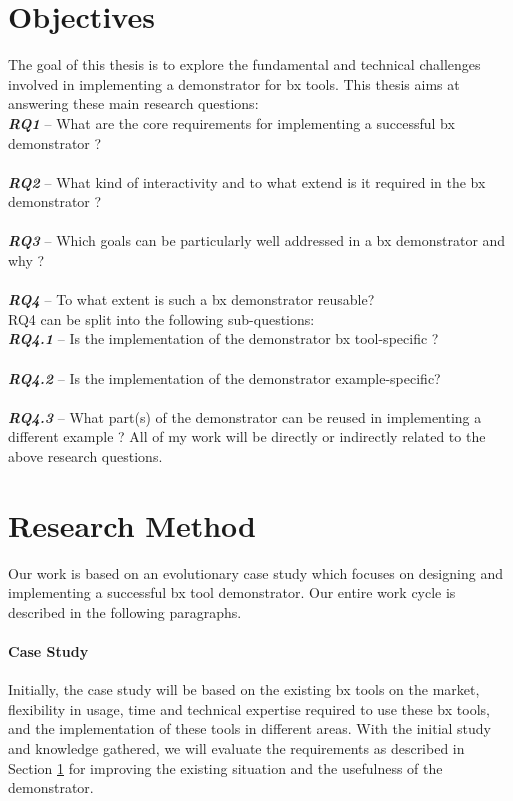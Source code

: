 \section{Objectives}\label{sec:objectives}
The goal of this thesis is to explore the fundamental and technical challenges involved in implementing a demonstrator for bx tools.
\newline\newline This thesis aims at answering these main research questions:
\\\textbf{\textit{RQ1}} -- What are the core requirements for implementing a successful bx demonstrator ?\\
\\\textbf{\textit{RQ2}} -- What kind of interactivity and to what extend is it required in the bx demonstrator ?\\
\\\textbf{\textit{RQ3}} -- Which goals can be particularly well addressed in a bx demonstrator and why ?\\
\\\textbf{\textit{RQ4}} -- To what extent is such a bx demonstrator reusable?\\
RQ4 can be split into the following sub-questions:
\\\textbf{\textit{RQ4.1}} -- Is the implementation of the demonstrator bx tool-specific ?\\
\\\textbf{\textit{RQ4.2}} -- Is the implementation of the demonstrator example-specific?\\
\\\textbf{\textit{RQ4.3}} -- What part(s) of the demonstrator can be reused in implementing a different example ?
\newline\newline All of my work will be directly or indirectly related to the above research questions.

\section{Research Method}\label{sec:research}
Our work is based on an \ac{evolutionary case study} which focuses on designing and implementing a successful bx tool demonstrator. Our entire work cycle is described in the following paragraphs.
\paragraph{Case Study}
Initially, the case study will be based on the existing bx tools on the market, flexibility in usage, time and technical expertise required to use these bx tools, and the implementation of these tools in different areas. With the initial study and knowledge gathered, we will evaluate the requirements as described in Section \ref{sec:objectives} for improving the existing situation and the usefulness of the demonstrator.
